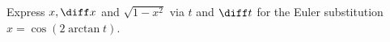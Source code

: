 \item Express $x, \diff x $ and $\sqrt{1-x^2}$ via $t$ and $\diff t$ for the Euler substitution $x=\cos(2\arctan t)$.
